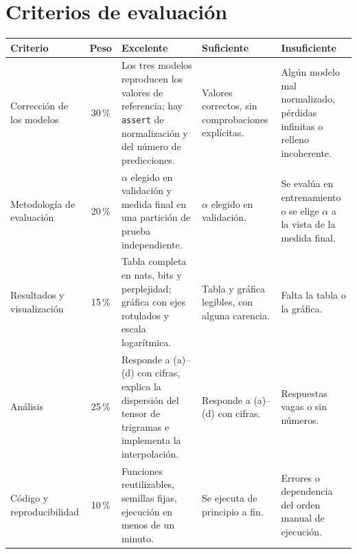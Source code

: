 \section*{Criterios de evaluación}
\begin{center}
\small
\renewcommand{\arraystretch}{1.15}
\begin{tabularx}{\textwidth}{@{}>{\raggedright\arraybackslash}p{2.3cm}c>{\raggedright\arraybackslash}X>{\raggedright\arraybackslash}X>{\raggedright\arraybackslash}X@{}}
\toprule
Criterio & Peso & Excelente & Suficiente & Insuficiente \\
\midrule
Corrección de los modelos & 30\,\% & Los tres modelos reproducen los valores de referencia; hay \texttt{assert} de normalización y del número de predicciones. & Valores correctos, sin comprobaciones explícitas. & Algún modelo mal normalizado, pérdidas infinitas o relleno incoherente. \\
\addlinespace
Metodología de evaluación & 20\,\% & $\alpha$ elegido en validación y medida final en una partición de prueba independiente. & $\alpha$ elegido en validación. & Se evalúa en entrenamiento o se elige $\alpha$ a la vista de la medida final. \\
\addlinespace
Resultados y visualización & 15\,\% & Tabla completa en nats, bits y perplejidad; gráfica con ejes rotulados y escala logarítmica. & Tabla y gráfica legibles, con alguna carencia. & Falta la tabla o la gráfica. \\
\addlinespace
Análisis & 25\,\% & Responde a (a)--(d) con cifras, explica la dispersión del tensor de trigramas e implementa la interpolación. & Responde a (a)--(d) con cifras. & Respuestas vagas o sin números. \\
\addlinespace
Código y reproducibilidad & 10\,\% & Funciones reutilizables, semillas fijas, ejecución en menos de un minuto. & Se ejecuta de principio a fin. & Errores o dependencia del orden manual de ejecución. \\
\bottomrule
\end{tabularx}
\end{center}
